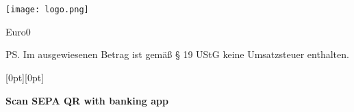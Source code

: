 \documentclass[a4paper]{scrlttr2}
\newcommand{\totalAmount}{}
\newcommand{\CalcFee}[3]{%
    \FPmul{\rawAmount}{#2}{#3} %
    \FPround{\totalAmount}{\rawAmount}{2} %
}
\begin{document}
	\begin{letter}{
	\ifthenelse{\equal{\customerCompany}{}}{}{\customerCompany \\}
	\ifthenelse{\equal{\customerName}{}}{}{\customerName \\} 
	\customerStreet \\ 
	\customerZIP~\customerCity}

		\texttt{[image: logo.png]}			
		\opening{\invoiceSalutation}
		\invoiceText

		\CalcFee{Software Beratung}{\hourprice}{\hournumber}
		
		    \begin{invoice}{Euro}{0}
			    
		    \end{invoice}
		
		\ps Im ausgewiesenen Betrag ist gemäß § 19 UStG keine Umsatzsteuer 
		enthalten.
		
		\renewcommand*{\raggedsignature}{\raggedright} 
		\closing{\invoiceClosing}
		\invoiceEnclosures

		\vspace*{0.5cm} %
		\noindent %
		\hfill %
		\raisebox{-3cm}[0pt][0pt]{%
		    \QRbill*[
		        Account=\accountIBAN,
		        Name=\senderName,
		        Amount=EUR\totalAmount,
		        Message={Rechnung \invoiceReference}
		    ]
		}

		\vspace*{3.2cm} %
		\noindent %
		\hfill %
		\textbf{Scan SEPA QR with banking app}
		\enlargethispage{30cm} %
	\end{letter}
\end{document}
